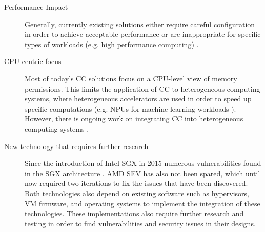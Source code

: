 \begin{description}
  \item[Performance Impact]
    Generally, currently existing solutions either require careful configuration
    in order to achieve acceptable performance or are inappropriate for specific
    types of workloads (e.g. high performance computing)
    \cite{akram2021performance}.
  \item[CPU centric focus]
    Most of today's CC solutions focus on a CPU-level view of memory
    permissions. This limits the application of CC to heterogeneous computing
    systems, where heterogeneous accelerators are used in order to speed up
    specific computations (e.g. NPUs for machine learning workloads
    \cite{chen2014mlaccelerators}). However, there is ongoing work on
    integrating CC into heterogeneous computing systems \cite{jiang2022cronus}.
  \item[New technology that requires further research]
    Since the introduction of Intel SGX in 2015 numerous vulnerabilities found
    in the SGX architecture \cite{fei2021sgxvulnerabilities}. AMD SEV has also
    not been spared, which until now required two iterations to fix the issues
    that have been discovered. Both technologies also depend on existing
    software such as hypervisors, VM firmware, and operating systems to
    implement the integration of these technologies. These implementations also
    require further research and testing in order to find vulnerabilities and
    security issues in their designs.
\end{description}
